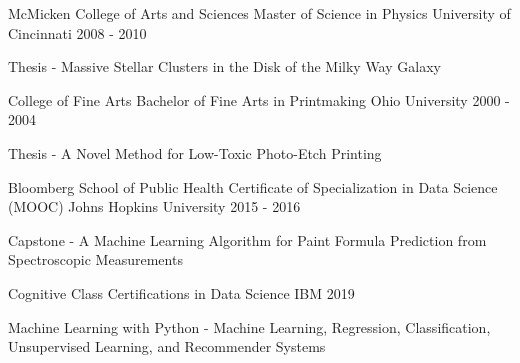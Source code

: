 

\begin{cventries}

  \cventry
    {McMicken College of Arts and Sciences} %
    {Master of Science in Physics} %
    {University of Cincinnati} %
    {2008 - 2010} %
    {
      \begin{cvitems} %
        \item {Thesis - Massive Stellar Clusters in the Disk of the Milky Way Galaxy}
      \end{cvitems}
    }

  \cventry
    {College of Fine Arts} %
    {Bachelor of Fine Arts in Printmaking} %
    {Ohio University} %
    {2000 - 2004} %
    {
      \begin{cvitems} %
        \item {Thesis - A Novel Method for Low-Toxic Photo-Etch Printing}
      \end{cvitems}
    }

  \cventry
    {Bloomberg School of Public Health} %
    {Certificate of Specialization in Data Science (MOOC)} %
    {Johns Hopkins University} %
    {2015 - 2016} %
    {
      \begin{cvitems} %
        \item {Capstone - A Machine Learning Algorithm for Paint Formula Prediction from Spectroscopic Measurements}
      \end{cvitems}
    }

  \cventry
    {Cognitive Class} %
    {Certifications in Data Science} %
    {IBM} %
    {2019} %
    {
      \begin{cvitems} %
        \item {Machine Learning with Python - Machine Learning, Regression, Classification, Unsupervised Learning, and Recommender Systems}
      \end{cvitems}
    }


\end{cventries}

